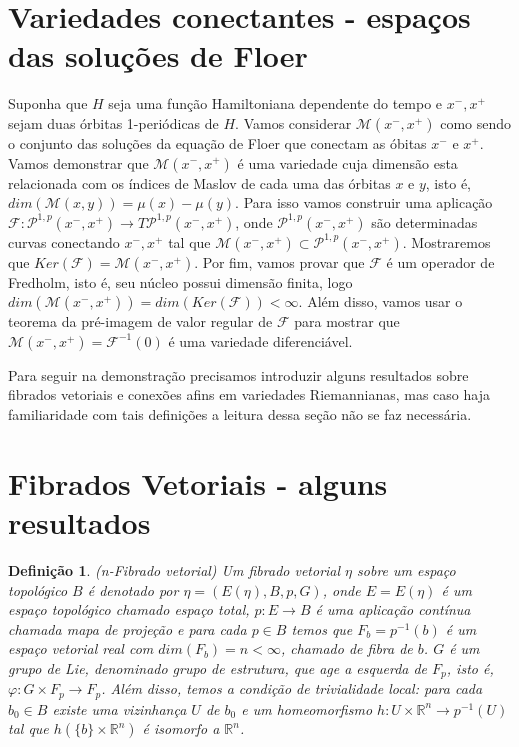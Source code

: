 \documentclass[12pt]{book}
\newtheorem{definicao}[teorema]{Definição}
\newcommand{\caminhosexponenciaisconectantes}[2]{\mathcal{P}^{1,p}(#1, #2)}
\newcommand{\caminhosexponenciaisconectantespadrao}{\caminhosexponenciaisconectantes{x^{-}}{x^{+}}}
\newcommand{\mapafloer}{\mathcal{F}}
\newcommand{\orbitasconectantes}[2]{\mathcal{M}(#1, #2)}
\newcommand{\orbitasconectantespadrao}{\mathcal{M}(x^{-}, x^{+})}
\newcommand{\real}[1]{\mathbb{R}^{#1}}
\begin{document}
	\section{Variedades conectantes - espaços das soluções de Floer}
	Suponha que $H$ seja uma função Hamiltoniana dependente do tempo e $x^{-}, x^{+}$ sejam duas órbitas 1-periódicas de $H$. Vamos considerar $\orbitasconectantespadrao$ como sendo o conjunto das soluções da equação de Floer que conectam as óbitas $x^{-}$ e $x^{+}$. Vamos demonstrar que $\orbitasconectantespadrao$ é uma variedade cuja dimensão esta relacionada com os índices de Maslov de cada uma das órbitas $x$ e $y$, isto é, $dim(\orbitasconectantes{x}{y}) = \mu(x)-\mu(y)$. Para  isso vamos construir uma aplicação $\mapafloer: \caminhosexponenciaisconectantespadrao \to T\caminhosexponenciaisconectantespadrao$, onde $\caminhosexponenciaisconectantespadrao$ são determinadas curvas conectando $x^{-}, x^{+}$ tal que $\orbitasconectantespadrao \subset \caminhosexponenciaisconectantespadrao$. Mostraremos que $Ker(\mapafloer) = \orbitasconectantespadrao$. Por fim, vamos provar que $\mapafloer$ é um operador de Fredholm, isto é, seu núcleo possui dimensão finita, logo $dim (\orbitasconectantespadrao) = dim (Ker(\mapafloer)) < \infty$. Além disso, vamos usar o teorema da pré-imagem de valor regular de $\mapafloer$ para mostrar que $\orbitasconectantespadrao = \mapafloer^{-1}(0)$ é uma variedade diferenciável.

	Para seguir na demonstração precisamos introduzir alguns resultados sobre fibrados vetoriais e conexões afins em variedades Riemannianas, mas caso haja familiaridade com tais definições a leitura dessa seção não se faz necessária.
	
	\section{Fibrados Vetoriais - alguns resultados}
	\begin{definicao}
		(n-Fibrado vetorial) Um fibrado vetorial $\eta$ sobre um espaço topológico $B$ é denotado por $\eta = (E(\eta), B, p, G)$, onde $E=E(\eta)$ é um espaço topológico chamado espaço total, $p:E\to B$ é uma aplicação contínua chamada mapa de projeção e para cada $p \in B$ temos que $F_{b}=p^{-1}(b)$ é um espaço vetorial real com $dim(F_{b}) = n < \infty$, chamado de fibra de $b$. $G$ é um grupo de Lie, denominado grupo de estrutura, que age a esquerda de $F_{p}$, isto é, $\varphi:G\times F_{p} \to F_{p}$. Além disso, temos a condição de trivialidade local: para cada $b_{0} \in B$ existe uma vizinhança $U$ de $b_{0}$ e um homeomorfismo $h:U\times\real{n} \to p^{-1}(U)$ tal que $h(\{b\} \times \real{n})$ é isomorfo a $\real{n}$.
	\end{definicao}
	
\end{document}
